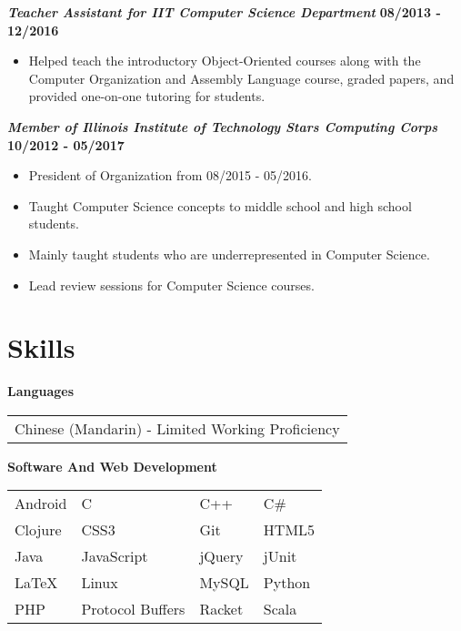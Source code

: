 \documentclass[10pt]{res}
\begin{document}
\begin{resume}
	\textbf{\textit{Teacher Assistant for IIT Computer Science Department}} 
	\vspace*{.25em}
	\hfill {\bf 08/2013 - 12/2016}
	\begin{itemize}
	  \item Helped teach the introductory Object-Oriented courses along with the Computer Organization and Assembly Language course, graded papers, and provided one-on-one tutoring for students. 
	\end{itemize}
	
	\textbf{\textit{Member of Illinois Institute of Technology Stars Computing Corps}}
	\vspace*{.25em}
	\hfill {\bf 10/2012 - 05/2017}
	\begin{itemize}
  \setlength\itemsep{0em}
	  \item President of Organization from 08/2015 - 05/2016.
	  \item Taught Computer Science concepts to middle school and high school students.  
	  \item Mainly taught students who are underrepresented in Computer Science.
	  \item Lead review sessions for Computer Science courses.
	\end{itemize}
	
\section{Skills}
\textbf{Languages} \\ 
	\begin{tabular}{ l }
		Chinese (Mandarin) - Limited Working Proficiency
	\end{tabular}
	
	\vspace{1pt}
\textbf{Software And Web Development} \\
	\begin{tabular}{  l    l    l    l  }
		Android	           &   C 	     			    	&   C++ 			&   C\# 	\\ 
		Clojure 			& 	CSS3 	 			& 	Git	 			& 	HTML5 \\
	     Java  				& 	JavaScript 			&	jQuery            &   jUnit  	 \\
		LaTeX   			&   Linux 				&	MySQL 			&	Python   \\    	
		PHP  	 			&	Protocol Buffers   	& 	Racket         	&	Scala							
	\end{tabular}
\end{resume}
\end{document}
